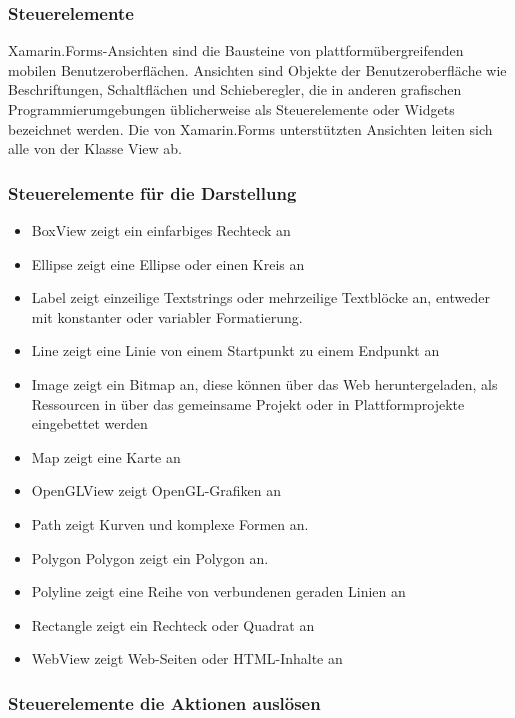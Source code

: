 \subsubsection{Steuerelemente}

Xamarin.Forms-Ansichten sind die Bausteine von plattformübergreifenden mobilen Benutzeroberflächen. Ansichten sind Objekte der Benutzeroberfläche wie Beschriftungen, Schaltflächen und Schieberegler, die in anderen grafischen Programmierumgebungen üblicherweise als Steuerelemente oder Widgets bezeichnet werden. Die von Xamarin.Forms unterstützten Ansichten leiten sich alle von der Klasse View ab. 
\subsubsection{Steuerelemente für die Darstellung}

\begin{itemize}
\setlength\itemsep{-0.6em}
 \item BoxView zeigt ein einfarbiges Rechteck an 
 \item Ellipse zeigt eine Ellipse oder einen Kreis an
  \item Label zeigt einzeilige Textstrings oder mehrzeilige Textblöcke an, entweder mit konstanter oder variabler Formatierung.
 \item Line zeigt eine Linie von einem Startpunkt zu einem Endpunkt an
 \item Image zeigt ein Bitmap an, diese können über das Web heruntergeladen, als Ressourcen in über das gemeinsame Projekt oder in Plattformprojekte eingebettet  werden
 \item Map zeigt eine Karte an
 \item OpenGLView zeigt OpenGL-Grafiken an
 \item Path zeigt Kurven und komplexe Formen an.
 \item Polygon Polygon zeigt ein Polygon an.
 \item  Polyline zeigt eine Reihe von verbundenen geraden Linien an
 \item Rectangle zeigt ein Rechteck oder Quadrat an
 \item WebView zeigt Web-Seiten oder HTML-Inhalte an
\end{itemize}

\subsubsection{Steuerelemente die Aktionen auslösen}

